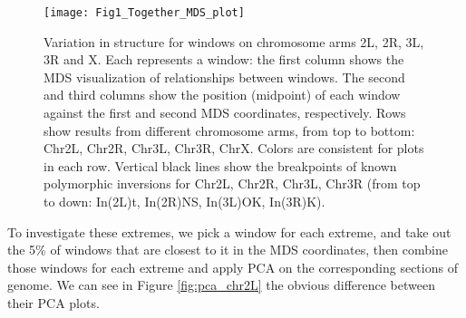 \documentclass[11pt, oneside]{article}   	%
\begin{document}
\begin{figure}
    \begin{center}
       \texttt{[image: Fig1\_Together\_MDS\_plot]}
    \end{center}
    \caption{
         Variation in structure for windows on chromosome arms 2L, 2R, 3L, 3R and X. 
         Each represents a window: the first column shows the MDS visualization of relationships between windows. 
         The second and third columns show the position (midpoint) of each window against the first and second MDS coordinates, respectively. 
         Rows show results from different chromosome arms, from top to bottom: Chr2L, Chr2R, Chr3L, Chr3R, ChrX. 
         Colors are consistent for plots in each row. 
         Vertical black lines show the breakpoints of known polymorphic inversions for Chr2L, Chr2R, Chr3L, Chr3R (from top to down: In(2L)t, In(2R)NS, In(3L)OK, In(3R)K).
         \label{fig:mds_chr2L}
    }
\end{figure}


To investigate these extremes, we pick a window for each extreme, 
and take out the 5\% of windows that are closest to it in the MDS coordinates, 
then combine those windows for each extreme and apply PCA on the corresponding sections of genome. 
We can see in Figure \ref{fig:pca_chr2L} the obvious difference between their PCA plots. 
\end{document}
